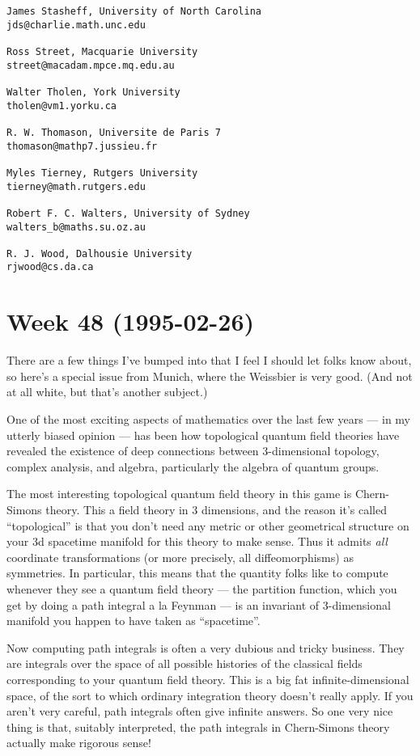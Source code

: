 \documentclass{article}
\begin{document}
\begin{verbatim}
James Stasheff, University of North Carolina
jds@charlie.math.unc.edu
 
Ross Street, Macquarie University 
street@macadam.mpce.mq.edu.au
 
Walter Tholen, York University
tholen@vm1.yorku.ca
 
R. W. Thomason, Universite de Paris 7
thomason@mathp7.jussieu.fr
 
Myles Tierney, Rutgers University
tierney@math.rutgers.edu
 
Robert F. C. Walters, University of Sydney
walters_b@maths.su.oz.au
 
R. J. Wood, Dalhousie University
rjwood@cs.da.ca
\end{verbatim}
\hypertarget{week48}{%
\section{Week 48 (1995-02-26)}\label{week48}}

There are a few things I've bumped into that I feel I should let folks
know about, so here's a special issue from Munich, where the Weissbier
is very good. (And not at all white, but that's another subject.)

One of the most exciting aspects of mathematics over the last few years
--- in my utterly biased opinion --- has been how topological quantum
field theories have revealed the existence of deep connections between
3-dimensional topology, complex analysis, and algebra, particularly the
algebra of quantum groups.

The most interesting topological quantum field theory in this game is
Chern-Simons theory. This a field theory in 3 dimensions, and the reason
it's called ``topological'' is that you don't need any metric or other
geometrical structure on your 3d spacetime manifold for this theory to
make sense. Thus it admits \emph{all} coordinate transformations (or
more precisely, all diffeomorphisms) as symmetries. In particular, this
means that the quantity folks like to compute whenever they see a
quantum field theory --- the partition function, which you get by doing
a path integral a la Feynman --- is an invariant of 3-dimensional
manifold you happen to have taken as ``spacetime''.

Now computing path integrals is often a very dubious and tricky
business. They are integrals over the space of all possible histories of
the classical fields corresponding to your quantum field theory. This is
a big fat infinite-dimensional space, of the sort to which ordinary
integration theory doesn't really apply. If you aren't very careful,
path integrals often give infinite answers. So one very nice thing is
that, suitably interpreted, the path integrals in Chern-Simons theory
actually make rigorous sense!
\end{document}
